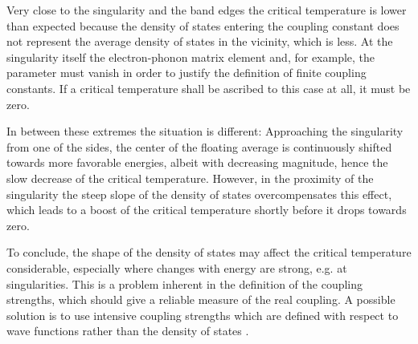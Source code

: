 Very close to the  singularity and the band edges the critical
temperature is lower than expected because the density of states entering the
coupling constant does not represent the average density of states in the
vicinity, which is less. At the singularity itself the electron-phonon matrix
element and, for example, the  parameter must vanish in order to
justify the definition of finite coupling constants. If a critical temperature
shall be ascribed to this case at all, it must be zero.

In between these extremes the situation is different: Approaching the  singularity from one of the sides, the center of the floating average is
continuously shifted towards more favorable energies, albeit with decreasing
magnitude, hence the slow decrease of the critical temperature. However, in the
proximity of the  singularity the steep slope of the density of
states overcompensates this effect, which leads to a boost of the critical
temperature shortly before it drops towards zero.

To conclude, the shape of the density of states may affect the critical
temperature considerable, especially where changes with energy are strong, e.g.
at  singularities. This is a problem inherent in the definition
of the coupling strengths, which should give a reliable measure of the real
coupling. A possible solution is to use intensive coupling strengths which are
defined with respect to wave functions rather than the density of states
\cite{PickettKlein81}.
